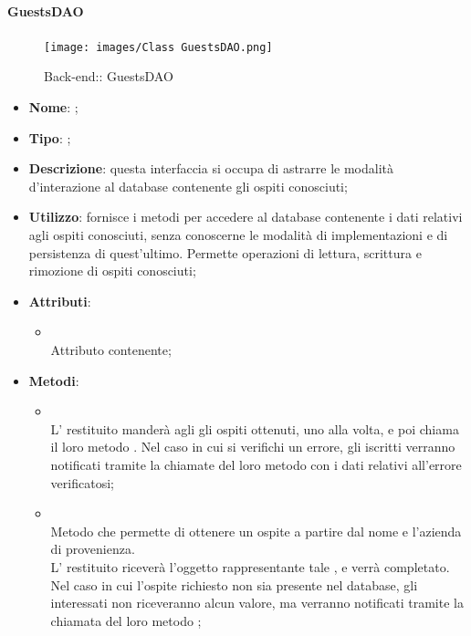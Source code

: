 \hypertarget{ GuestsDAO_label}{\paragraph{ GuestsDAO}}
\begin{figure}[h]
	\centering
	\texttt{[image: images/Class GuestsDAO.png]}
	\caption{Back-end:: GuestsDAO}
\end{figure}
\begin{itemize}
	\item \textbf{Nome}: ;
	\item \textbf{Tipo}: ;
	\item \textbf{Descrizione}: questa interfaccia si occupa di astrarre le modalità d'interazione al database contenente gli ospiti conosciuti;
	\item \textbf{Utilizzo}: fornisce i metodi per accedere al database contenente i dati relativi agli ospiti conosciuti, senza conoscerne le modalità di implementazioni e di persistenza di quest'ultimo. Permette operazioni di lettura, scrittura e rimozione di ospiti conosciuti;
	\item \textbf{Attributi}:
	\begin{itemize}
		\item[]  \\
		Attributo contenente;
	\end{itemize}
	\item \textbf{Metodi}:
	\begin{itemize}
		\item[]  \\
		L' restituito manderà agli  gli ospiti ottenuti, uno alla volta, e poi chiama il loro metodo . Nel caso in cui si verifichi un errore, gli  iscritti verranno notificati tramite la chiamate del loro metodo  con i dati relativi all'errore verificatosi;\\
		\item[]  \\
		Metodo che permette di ottenere un ospite a partire dal nome e l'azienda di provenienza. \\
L' restituito riceverà l'oggetto rappresentante tale , e verrà completato. Nel caso in cui l'ospite richiesto non sia presente nel database, gli  interessati non riceveranno alcun valore, ma verranno notificati tramite la chiamata del loro metodo ;\\

\end{itemize}
\end{itemize}
